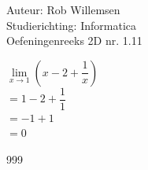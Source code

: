 \documentclass[a4paper]{article}
\begin{document}
\noindent \large Auteur: Rob Willemsen \\
\noindent \large Studierichting: Informatica\\
\noindent \large Oefeningenreeks 2D nr. 1.11\\

\medskip

\normalsize

$\lim\limits_{x \rightarrow 1} \left(x - 2 + \dfrac{1}{x}\right)$ \\ 

$= 1 - 2 + \dfrac{1}{1} $ \\

$= -1 + 1 $ \\

$= 0$ \\

\begin{thebibliography}{999}
\end{thebibliography}
\end{document}
